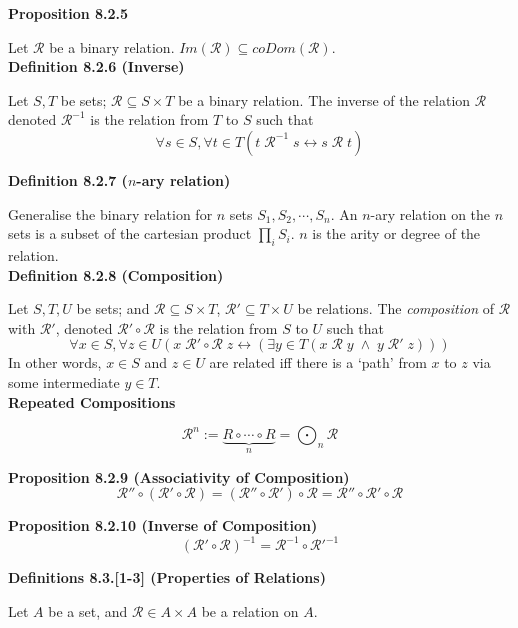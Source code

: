 \documentclass[a4paper]{article}
\newcommand{\subheading}[1]{{\scriptsize\textbf{#1}}}
\begin{document}
\begin{multicols*}{4}
\subheading{Proposition 8.2.5}

Let $\mathcal{R}$ be a binary relation. $Im(\mathcal{R}) \subseteq
coDom(\mathcal{R})$. \\

\subheading{Definition 8.2.6 (Inverse)}

Let $S, T$ be sets; $\mathcal{R} \subseteq S \times T$ be a binary relation. The
inverse of the relation $\mathcal{R}$ denoted $\mathcal{R}^{-1}$ is the relation
from $T$ to $S$ such that
$$\forall s \in S, \forall t \in T
  (t\;\mathcal{R}^{-1}\;s \longleftrightarrow s\;\mathcal{R}\;t)$$

\subheading{Definition 8.2.7 ($n$-ary relation)}

Generalise the binary relation for $n$ sets $S_1, S_2, \cdots, S_n$. An $n$-ary
relation on the $n$ sets is a subset of the cartesian product $\prod_{i} S_i$.
$n$ is the arity or degree of the relation.\\

\subheading{Definition 8.2.8 (Composition)}

Let $S, T, U$ be sets; and $\mathcal{R} \subseteq S \times T$, $\mathcal{R}'
\subseteq T \times U$ be relations. The \textit{composition} of $\mathcal{R}$
with $\mathcal{R}'$, denoted $\mathcal{R}' \circ \mathcal{R}$ is the relation from
$S$ to $U$ such that
$$\forall x \in S, \forall z \in U (
  x\;\mathcal{R}' \circ \mathcal{R}\;z \leftrightarrow
    (\exists y \in T (x\;\mathcal{R}\;y\;\land\;y\;\mathcal{R}'\;z))
)$$
In other words, $x \in S$ and $z \in U$ are related iff there is a `path' from
$x$ to $z$ via some intermediate $y \in T$.\\

\subheading{Repeated Compositions}

$$\mathcal{R}^n := \underbrace{R \circ \cdots \circ R}_n
    = \bigodot_n \mathcal{R}$$


\subheading{Proposition 8.2.9 (Associativity of Composition)}
$$\mathcal{R}'' \circ (\mathcal{R}' \circ \mathcal{R}) =
  (\mathcal{R}'' \circ \mathcal{R}') \circ \mathcal{R} =
  \mathcal{R}'' \circ \mathcal{R}' \circ \mathcal{R}$$

\subheading{Proposition 8.2.10 (Inverse of Composition)}
$$(\mathcal{R}' \circ \mathcal{R})^{-1} =
  \mathcal{R}^{-1} \circ \mathcal{R}'^{-1}$$

  \subheading{Definitions 8.3.[1-3] (Properties of Relations)}

Let $A$ be a set, and $\mathcal{R} \in A \times A$ be a relation on $A$.\\


\end{multicols*}
\end{document}
